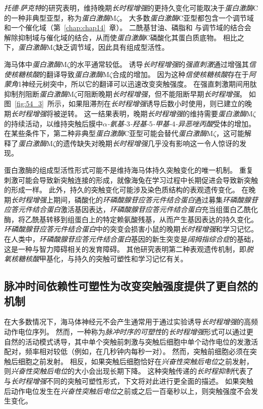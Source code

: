\textit{托德$\cdot$萨克特}的研究表明，维持晚期\textit{长时程增强}的更持久变化可能取决于\textit{蛋白激酶}C的一种非典型亚型，称为\textit{蛋白激酶}M$\zeta$。
大多数\textit{蛋白激酶}C亚型都包含一个调节域和一个催化域（第~\ref{chap:chap14}~章）。
二酰基甘油、磷脂和  与调节域的结合会解除抑制域与催化域的结合，从而使\textit{蛋白激酶}C磷酸化其蛋白质底物。
相比之下，\textit{蛋白激酶}M$\zeta$缺乏调节域，因此具有组成型活性。


海马体中\textit{蛋白激酶}M$\zeta$的水平通常较低。
诱导\textit{长时程增强}的\textit{强直刺激}通过增强其\textit{信使核糖核酸}的翻译导致\textit{蛋白激酶}M$\zeta$合成的增加。
因为这种\textit{信使核糖核酸}存在于\textit{阿蒙角}1神经元树突中，所以它的翻译可以迅速改变突触强度。
在强直刺激期间用肽抑制剂阻断\textit{蛋白激酶}M$\zeta$可阻断晚期\textit{长时程增强}，但不能阻断早期\textit{长时程增强}。
如图~\ref{fig:54_3}~所示，如果阻滞剂在\textit{长时程增强}诱导后数小时使用，则已建立的晚期\textit{长时程增强}将被逆转。
这一结果表明，晚期\textit{长时程增强}的维持需要\textit{蛋白激酶}M$\zeta$的持续活动，以维持突触后膜中\textit{$\alpha$-氨基-}3\textit{-羟基-}5\textit{-甲基-}4\textit{-异恶唑丙酸}受体的增加。
在某些条件下，第二种非典型\textit{蛋白激酶}C亚型可能会替代\textit{蛋白激酶}M$\zeta$，这可能解释了\textit{蛋白激酶}M$\zeta$的遗传缺失对晚期\textit{长时程增强}几乎没有影响这一令人惊讶的发现。


蛋白激酶的组成型活性形式可能不是维持海马体持久突触变化的唯一机制。
重复刺激可能会导致新突触连接的形成，就像海兔在学习过程中长期促进会导致新突触的形成一样。
此外，持久的突触变化可能涉及染色质结构的表观遗传变化。
在晚期\textit{长时程增强}上期间，磷酸化的\textit{环磷酸腺苷应答元件结合蛋白}通过募集\textit{环磷酸腺苷应答元件结合蛋白}激活基因表达，\textit{环磷酸腺苷应答元件结合蛋白}充当组蛋白乙酰化酶，将乙酰基转移到组蛋白上的特定赖氨酸残基，从而产生基因表达的持久变化。
\textit{环磷酸腺苷应答元件结合蛋白}中的突变会损害小鼠的晚期\textit{长时程增强}和学习记忆。
在人类中，\textit{环磷酸腺苷应答元件结合蛋白}基因的新生突变是\textit{阔拇指综合症}的基础，这是一种与智力障碍相关的发育障碍。
其他研究表明第二种表观遗传机制，即\textit{脱氧核糖核酸}甲基化，与持久的突触可塑性和学习记忆有关。



\subsection{脉冲时间依赖性可塑性为改变突触强度提供了更自然的机制}

在大多数情况下，海马体神经元不会产生通常用于通过实验诱导\textit{长时程增强}的高频动作电位序列。
然而，一种称为\textit{脉冲时序的可塑性}的\textit{长时程增强}形式可以通过更自然的活动模式诱导，其中单个突触前刺激与突触后细胞中单个动作电位的发激活配对，频率相对较低（例如，在几秒钟内每秒一对）。
然而，突触前细胞必须在突触后细胞之前发射。
相反，如果突触后细胞恰好在\textit{兴奋性突触后电位}之前发射，则\textit{兴奋性突触后电位}的大小会出现长期下降。
这种突触传递的\textit{长时程抑制}代表了与\textit{长时程增强}不同的突触可塑性形式，下文将对此进行更全面的描述。
如果突触后动作电位发生在\textit{兴奋性突触后电位}之前或之后一百毫秒以上，则突触强度不会发生变化。


